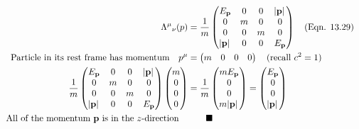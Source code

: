 \documentclass{article}
\begin{document}
\begin{align*}
  { \Lambda^\mu}_\nu(p)                                           & =\frac{1}{m}\begin{pmatrix}
    E_{\vb{p}}    & 0 & 0 & \abs*{\vb{p}} \\
    0             & m & 0 & 0             \\
    0             & 0 & m & 0             \\
    \abs*{\vb{p}} & 0 & 0 & E_{\vb{p}}    \\
  \end{pmatrix}\qq{(Eqn. 13.29)}              \\
  \qq*{Particle in its rest frame has momentum}p^\mu              & =\begin{pmatrix}
    m & 0 & 0 & 0 \\
  \end{pmatrix}\qq{(recall $c^2=1$)}                     \\
  \frac{1}{m}\begin{pmatrix}
    E_{\vb{p}}    & 0 & 0 & \abs*{\vb{p}} \\
    0             & m & 0 & 0             \\
    0             & 0 & m & 0             \\
    \abs*{\vb{p}} & 0 & 0 & E_{\vb{p}}    \\
  \end{pmatrix}\begin{pmatrix}
    m \\ 0 \\ 0 \\ 0 \\
  \end{pmatrix} & =\frac{1}{m}\begin{pmatrix}
    mE_{\vb{p}} \\ 0 \\ 0 \\ m\abs*{\vb{p}} \\
  \end{pmatrix}   =\begin{pmatrix}
    E_{\vb{p}} \\ 0 \\ 0 \\ \abs*{\vb{p}} \\
  \end{pmatrix} \\
  \qq*{All of the momentum $\vb{p}$ is in the $z$-direction}      & \qquad\blacksquare                                                   \\
\end{align*}
\end{document}
